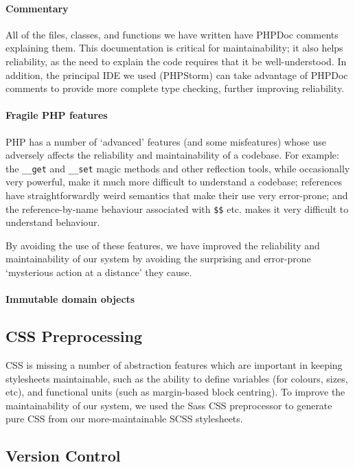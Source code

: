 \paragraph{Commentary}
All of the files, classes, and functions we have written have PHPDoc
comments explaining them. This documentation is critical for
maintainability; it also helps reliability, as the need to explain
the code requires that it be well-understood. In addition, the
principal IDE we used (PHPStorm) can take advantage of PHPDoc comments
to provide more complete type checking, further improving reliability.

\paragraph{Fragile PHP features}
PHP has a number of `advanced' features (and some misfeatures) whose
use adversely affects the reliability and maintainability of a
codebase. For example: the \verb!__get! and \verb!__set! magic methods
and other reflection tools, while occasionally very powerful, make it
much more difficult to understand a codebase; references have
straightforwardly weird semantics that make their use very
error-prone; and the reference-by-name behaviour associated with
\verb!$$! etc. makes it very difficult to understand behaviour.

By avoiding the use of these features, we have improved the
reliability and maintainability of our system by avoiding the
surprising and error-prone `mysterious action at a distance' they
cause.

\paragraph{Immutable domain objects}

\subsection{CSS Preprocessing}

CSS is missing a number of abstraction features which are important in
keeping stylesheets maintainable, such as the ability to define
variables (for colours, sizes, etc), and functional units (such as
margin-based block centring). To improve the maintainability of our
system, we used the Sass CSS preprocessor to generate
pure CSS from our more-maintainable SCSS stylesheets.

\subsection{Version Control}

